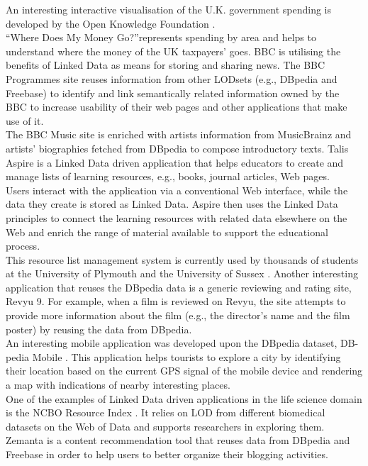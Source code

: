 \documentclass[a4paper,12pt,oneside]{report}
\begin{document}
{{{{ An interesting interactive visualisation of the U.K. government spending is developed by the Open Knowledge Foundation . \\
“Where Does My Money Go?”represents spending by area and helps to understand where the money of the UK taxpayers’ goes.
BBC is utilising the benefits of Linked Data as means for storing and sharing news. The BBC Programmes site  reuses information from other LODsets (e.g., DBpedia
and Freebase) to identify and link semantically related information owned by the BBC to increase usability of their web pages and other applications that make use of it.\\
The BBC Music site  is enriched with artists information from MusicBrainz  and artists’ biographies fetched from DBpedia to compose introductory texts.
Talis Aspire  is a Linked Data driven application that helps educators to create and manage lists of learning resources, e.g., books, journal articles, Web pages.\\
 Users interact with the application via a conventional Web interface, while the data they create is stored as Linked Data. Aspire then uses the Linked Data principles to connect the learning resources with related data elsewhere on the Web and enrich the range of material available to support the educational process.\\
 This resource list management system is currently used by thousands of students at the University of Plymouth and the University of Sussex . Another interesting application that reuses the DBpedia data is a generic reviewing and rating site, Revyu 9. For example, when a film is reviewed on Revyu, the site attempts to provide more information about the film (e.g., the director’s name and the film poster) by reusing the data from DBpedia.\\
An interesting mobile application was developed upon the DBpedia dataset, DB-pedia Mobile . This application helps tourists to explore a city by identifying their location based on the current GPS signal of the mobile device and rendering a map with indications of nearby interesting places.\\
One of the examples of Linked Data driven applications in the life science domain is the NCBO Resource Index . It relies on LOD from different biomedical datasets on the Web of Data and supports researchers in exploring them. \\
Zemanta  is a content recommendation tool that reuses data from DBpedia and Freebase in order to help users to better organize their blogging activities.\\
}}}}
\end{document}
